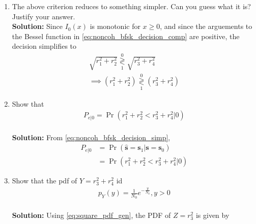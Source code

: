 \documentclass[journal,10pt,twocolumn]{IEEEtran}
\providecommand{\pr}[1]{\ensuremath{\Pr\left(#1\right)}}
\providecommand{\brak}[1]{\ensuremath{\left(#1\right)}}
\newcommand{\solution}{\noindent \textbf{Solution: }}
\providecommand{\dec}[2]{\ensuremath{\overset{#1}{\underset{#2}{\gtrless}}}}
\let\vec\mathbf
\begin{document}
\begin{enumerate}
\begin{enumerate}[label=(\alph{enumii})]
\solution The PDF of $\vec{r}|1$ has a similar form to \eqref{eq:noncoh_bfsk_pdf},
\begin{equation}
	p\brak{\mathbf{r}|1} = \frac{1}{N_0^2\pi^2}e^{-\frac{r_1^2+r_2^2+r_3^2+r_4^2+E_b}{N_0}}I_{0}\brak{\frac{2\sqrt{E_b}}{N_0}\sqrt{r_3^2+r_4^2}}
	\label{eq:noncoh_bfsk_pdf_one}
\end{equation}
From \eqref{eq:noncoh_bfsk_pdf} and \eqref{eq:noncoh_bfsk_pdf_one},
\begin{align}
	p\brak{\mathbf{r}|0} &=  f(\vec{r}) I_{0}\brak{k\sqrt{r_1^2+r_2^2}}\\
	p\brak{\mathbf{r}|1} &=  f(\vec{r}) I_{0}\brak{k\sqrt{r_3^2+r_4^2}}
\end{align}
Using the MLE rule from \eqref{eq:mle_rule}, the optimum decision is given by
\begin{align}
I_0\brak{k\sqrt{r_1^2+r_2^2}}\dec{0}{1}I_0\brak{k\sqrt{r_3^2+r_4^2}}
\end{align}
%
\item 
The above criterion reduces to something simpler.  Can you guess what it is?  Justify your answer.\\
\solution Since $I_{0}(x)$ is monotonic for $x \ge 0$, and since the arguements to the Bessel function in \eqref{eq:noncoh_bfsk_decision_comp} %
are positive, the decision simplifies to
\begin{align}
	\nonumber
	\sqrt{r_1^2+r_2^2}\dec{0}{1}\sqrt{r_3^2+r_4^2}\\
	\label{eq:noncoh_bfsk_decision_simp}
	\implies \brak{r_1^2+r_2^2}\dec{0}{1}\brak{r_3^2+r_4^2}
\end{align}
%
\item 
Show that 
%
\begin{align}
P_{e|0}=\pr{r_1^2+r_2^2 < r_3^2+r_4^2 | 0}
\end{align}\\
\solution From \eqref{eq:noncoh_bfsk_decision_simp},
\begin{align}
P_{e|0} &= \pr{\hat{\vec{s}} = \vec{s}_1 | \vec{s} = \vec{s}_0}\\
	&=\pr{r_1^2+r_2^2 < r_3^2+r_4^2 | 0}
\end{align}
%
\item 
Show that the pdf of $Y=r_3^2+r_4^2$ id
%
\begin{align}
\label{eq:noncoh_bfsk_r34sq_pdf}
p_{Y}(y) = \frac{1}{N_0}e^{-\frac{y}{N_0}}, y > 0
\end{align}\\
\solution Using \eqref{eq:square_pdf_gen}, the PDF of $Z=r_3^2$ is given by

\end{enumerate}
\end{enumerate}
\end{document}
